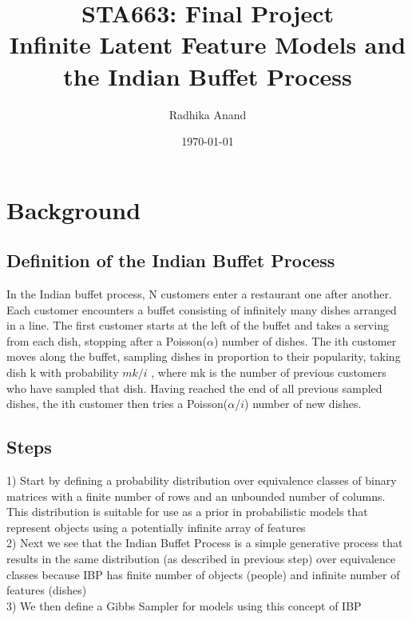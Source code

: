 \documentclass[11pt]{article}
\begin{document}
\author{Radhika Anand}
\title{STA663: Final Project \\Infinite Latent Feature Models and the Indian Buffet Process}
\date{\today}
\maketitle

\section{Background}
\subsection{Definition of the Indian Buffet Process}

In the Indian buffet process, N customers enter a restaurant one after another. Each customer encounters a buffet consisting of infinitely many dishes arranged in a line. The first customer starts at the left of the buffet and takes a serving from each dish, stopping after a Poisson($\alpha$) number of dishes. The ith customer moves along the buffet, sampling dishes in proportion to their popularity, taking dish k with probability $mk/i$ , where mk is the number of previous customers who have sampled that dish. Having reached the end of all previous sampled dishes, the ith customer then tries a Poisson($\alpha$/$i$) number of new dishes.


\subsection{Steps}

1) Start by defining a probability distribution over equivalence classes of binary matrices with a finite number of rows and an unbounded number of columns. This distribution is suitable for use as a prior in probabilistic models that represent objects using a potentially infinite array of features\\

2) Next we see that the Indian Buffet Process is a simple generative process that results in the same distribution (as described in previous step) over equivalence classes because IBP has finite number of objects (people) and infinite number of features (dishes)\\

3) We then define a Gibbs Sampler for models using this concept of IBP\\
\end{document}
